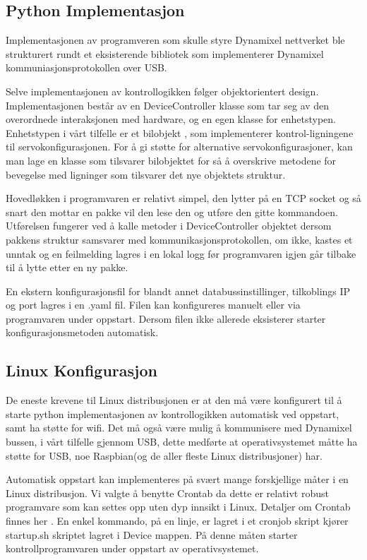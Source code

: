 \documentclass[12pt]{report}
\begin{document}
\subsection{Python Implementasjon}
Implementasjonen av programveren som skulle styre Dynamixel nettverket ble strukturert rundt et eksisterende bibliotek som implementerer Dynamixel kommuniasjonsprotokollen over USB\cite{DynaCommProt}.

Selve implementasjonen av kontrollogikken følger objektorientert design. Implementasjonen består av en DeviceController klasse som tar seg av den overordnede interaksjonen med hardware, og en egen klasse for enhetstypen. Enhetstypen i vårt tilfelle er et bilobjekt , som implementerer kontrol-ligningene til servokonfigurasjonen. For å gi støtte for alternative servokonfigurasjoner, kan man lage en klasse som tilsvarer bilobjektet for så å overskrive metodene for bevegelse med ligninger som tilsvarer det nye objektets struktur.

Hovedløkken i programvaren er relativt simpel, den lytter på en TCP socket og så snart den mottar en pakke vil den lese den og utføre den gitte kommandoen. Utførelsen fungerer ved å kalle metoder i DeviceController objektet dersom pakkens struktur samsvarer med kommunikasjonsprotokollen, om ikke, kastes et unntak og en feilmelding lagres i en lokal logg før programvaren igjen går tilbake til å lytte etter en ny pakke.

En ekstern konfigurasjonsfil for blandt annet databussinstillinger, tilkoblings IP  og port lagres i en .yaml fil. Filen kan konfigureres manuelt eller via programvaren under oppstart. Dersom filen ikke allerede eksisterer starter konfigurasjonsmetoden automatisk.

\subsection{Linux Konfigurasjon}
De eneste krevene til Linux distribusjonen er at den må være konfigurert til å starte python implementasjonen av kontrollogikken automatisk ved oppstart, samt ha støtte for wifi. Det må også være mulig å kommunisere med Dynamixel bussen, i vårt tilfelle gjennom USB, dette medførte at operativsystemet måtte ha støtte for USB, noe Raspbian(og de aller fleste Linux distribusjoner) har.

Automatisk oppstart kan implementeres på svært mange forskjellige måter i en Linux distribusjon. Vi valgte å benytte Crontab da dette er relativt robust programvare som kan settes opp uten dyp innsikt i Linux. Detaljer om Crontab finnes her \cite{Crontab}. En enkel kommando, på en linje, er lagret i et cronjob skript kjører startup.sh skriptet lagret i Device mappen. På denne måten starter kontrollprogramvaren under oppstart av operativsystemet.
\end{document}

